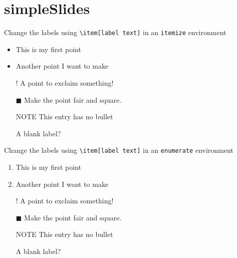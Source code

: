 \section{simpleSlides}

\begin{frame}[fragile]
    Change the labels using \verb|\item[label text]| in an
    \texttt{itemize} environment

    \begin{itemize}
        \item This is my first point
        \item Another point I want to make
        \item[!] A point to exclaim something!
        \item[$\blacksquare$] Make the point fair and square.
        \item[NOTE] This entry has no bullet
        \item[] A blank label?
    \end{itemize}
\end{frame}

\begin{frame}[fragile]
    Change the labels using \verb|\item[label text]| in an
    \texttt{enumerate} environment
    \begin{enumerate}
        \item This is my first point
        \item Another point I want to make
        \item[!] A point to exclaim something!
        \item[$\blacksquare$] Make the point fair and square.
        \item[NOTE] This entry has no bullet
        \item[] A blank label?
    \end{enumerate}
\end{frame}